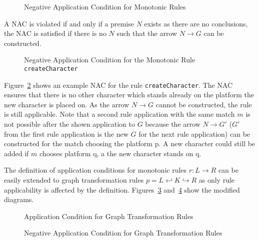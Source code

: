 \begin{figure}[h!]
	\centering
	
	\caption{Negative Application Condition for Monotonic Rules}
	\label{fig:nac}
\end{figure}

\noindent
A NAC is violated if and only if a premise $N$ exists as there are no conclusions, \ie the NAC is satisfied if there is no $N$ such that the arrow $N \rightarrow G$ can be constructed.

\begin{figure}[h!]
	\centering
	
	\caption{Negative Application Condition for the Monotonic Rule \texttt{createCharacter}}
	\label{fig:example-nac}
\end{figure}

\noindent
Figure~\ref{fig:example-nac} shows an example NAC for the rule \texttt{createCharacter}.
The NAC ensures that there is no other character which stands already on the platform the new character is placed on. 
As the arrow $N \rightarrow G$ cannot be constructed, the rule is still applicable.
Note that a second rule application with the same match $m$ is not possible after the shown application to $G$ because the arrow $N \rightarrow G'$ ($G'$ from the first rule application is the new $G$ for the next rule application) can be constructed for the match choosing the platform p.
A new character could still be added if $m$ chooses platform q, \ie a the new character stands on q.

The definition of application conditions for monotonic rules $r: L \rightarrow R$ can be easily extended to graph transformation rules $p = L \hookleftarrow K \hookrightarrow R$ as only rule applicability is affected by the definition.
Figures~\ref{fig:application-condition-gt} and~\ref{fig:nac-gt} show the modified diagrams.

\begin{figure}[h!]
	\centering
	
	\caption{Application Condition for Graph Transformation Rules}
	\label{fig:application-condition-gt}
\end{figure}

\begin{figure}[h!]
	\centering
	
	\caption{Negative Application Condition for Graph Transformation Rules}
	\label{fig:nac-gt}
\end{figure}
